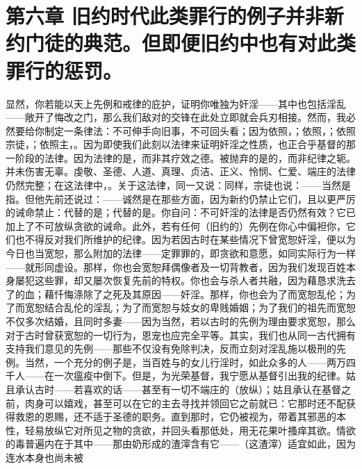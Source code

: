 
\section{第六章 旧约时代此类罪行的例子并非新约门徒的典范。但即便旧约中也有对此类罪行的惩罚。}

显然，你若能以天上先例和戒律的庇护，证明你唯独为奸淫——其中也包括淫乱——敞开了悔改之门，那么我们敌对的交锋在此处立即就会兵刃相接。然而，我必然要给你制定一条律法：不可伸手向旧事，不可回头看；因为依照，；依照，；依照宗徒，；依照主，。因为即使我们此刻以法律来证明奸淫之性质，也正合乎基督的那一阶段的法律。因为法律的是，而非其疗效之德。被抛弃的是的，而非纪律之轭。并未伤害无辜。虔敬、圣德、人道、真理、贞洁、正义、怜悯、仁爱、端庄的法律仍然完整；在这法律中，。关于这法律，同一又说：同样，宗徒也说：——当然是指。但他先前还说过：——诚然是在那些方面，因为新约仍禁止它们，且以更严厉的诫命禁止：代替的是；代替的是。你自问：不可奸淫的法律是否仍然有效？它已加上了不可放纵贪欲的诫命。此外，若有任何（旧约的）先例在你心中偏袒你，它们也不得反对我们所维护的纪律。因为若因古时在某些情况下曾宽恕奸淫，便以为今日也当宽恕，那么附加的法律——定罪罪的，即贪欲和意愿，如同实际行为一样——就形同虚设。那样，你也会宽恕拜偶像者及一切背教者，因为我们发现百姓本身屡犯这些罪，却又屡次恢复先前的特权。你也会与杀人者共融，因为藉恳求洗去了的血；藉忏悔涤除了之死及其原因——奸淫。那样，你也会为了而宽恕乱伦；为了而宽恕结合乱伦的淫乱；为了而宽恕与妓女的卑贱婚姻；为了我们的祖先而宽恕不仅多次结婚，且同时多妻——因为当然，若以古时的先例为理由要求宽恕，那么对于古时曾获宽恕的一切行为，恩宠也应完全平等。其实，我们也从同一古代拥有支持我们意见的先例——那些不仅没有免除判决，反而立刻对淫乱施以极刑的先例。当然，一个充分的例子是，当百姓与的女儿行淫时，如此众多的人——两万四千人——在一次瘟疫中倒下。但是，为光荣基督，我宁愿从基督引出我的纪律。姑且承认古时——若喜欢的话——甚至有一切不端庄的（放纵）；姑且承认在基督之前，肉身可以嬉戏，甚至可以在它的主去寻找并领回它之前就已：它那时还不配获得救恩的恩赐，还不适于圣德的职务。直到那时，它仍被视为，带着其邪恶的本性，轻易放纵它对所见之物的贪欲，并回头看那低处，用无花果叶搔痒其欲。情欲的毒普遍内在于其中——那由奶形成的渣滓含有它——（这渣滓）适宜如此，因为连水本身也尚未被
